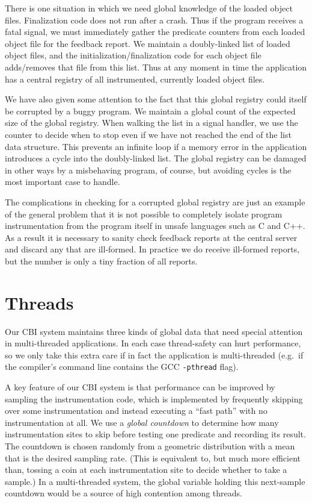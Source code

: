 \documentclass[10pt,twocolumn]{article}
\newcommand{\termdef}[1]{\emph{#1}}
\begin{document}
There is one situation in which we need global knowledge of the loaded
object files.  Finalization code does not run after a crash.  Thus if
the program receives a fatal signal, we must immediately gather the
predicate counters from each loaded object file for the feedback
report.  We maintain a doubly-linked list of loaded object files, and
the initialization/finalization code for each object file adds/removes
that file from this list.  Thus at any moment in time the application
has a central registry of all instrumented, currently loaded object
files.

We have also given some attention to the fact that this global
registry could itself be corrupted by a buggy program.  We maintain a
global count of the expected size of the global registry.  When
walking the list in a signal handler, we use the counter to decide
when to stop even if we have not reached the end of the list data
structure.  This prevents an infinite loop if a memory error in the
application introduces a cycle into the doubly-linked list.  The
global registry can be damaged in other ways by a misbehaving program,
of course, but avoiding cycles is the most important case to handle.

The complications in checking for a corrupted global registry are just
an example of the general problem that it is not possible to
completely isolate program instrumentation from the program itself in
unsafe languages such as C and C++.  As a result it is necessary to
sanity check feedback reports at the central server and discard any
that are ill-formed.  In practice we do receive ill-formed reports,
but the number is only a tiny fraction of all reports.

\section{Threads}

Our CBI system maintains three kinds of global data that need special
attention in multi-threaded applications.  In each case thread-safety
can hurt performance, so we only take this extra care if in fact the
application is multi-threaded (e.g.\ if the compiler's command line
contains the GCC \texttt{-pthread} flag).

A key feature of our CBI system is that performance can be improved by
sampling the instrumentation code, which is implemented by frequently
skipping over some instrumentation and instead executing a ``fast
path'' with no instrumentation at all.  We use a \termdef{global
  countdown} to determine how many instrumentation sites to skip
before testing one predicate and recording its result.  The countdown
is chosen randomly from a geometric distribution with a mean that is
the desired sampling rate.  (This is equivalent to, but much more
efficient than, tossing a coin at each instrumentation site to decide
whether to take a sample.)  In a multi-threaded system, the global
variable holding this next-sample countdown would be a source of high
contention among threads.
\end{document}
